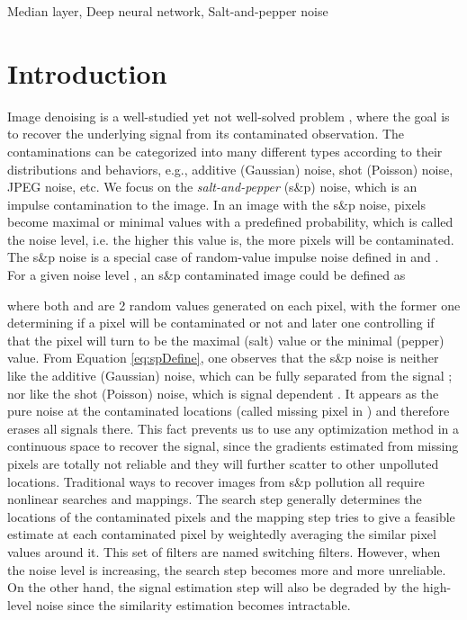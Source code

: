 \documentclass[journal]{IEEEtran}
\begin{document}
\begin{IEEEkeywords}
Median layer, Deep neural network, Salt-and-pepper noise
\end{IEEEkeywords}






\IEEEpeerreviewmaketitle



\section{Introduction}

Image denoising is a well-studied yet not well-solved problem \cite{zhang2017beyond,zhang2018ffdnet,Liu2018,Fu2018Multimedia,Lehtinen2018,aaai_furuta_2019,chen2018DeepBoosting}, where the goal is to recover the underlying signal from its contaminated observation. The contaminations can be categorized into many different types according to their distributions and behaviors, e.g., additive (Gaussian) noise, shot (Poisson) noise, JPEG noise, etc. We focus on the \emph{salt-and-pepper} (s\&p) noise, which is an impulse contamination to the image. In an image with the s\&p noise, pixels become maximal or minimal values with a predefined probability, which is called the noise level, i.e. the higher this value is, the more pixels will be contaminated. The s\&p noise is a special case of random-value impulse noise defined in \cite{Fu2018Multimedia} and \cite{Lehtinen2018}. For a given noise level , an s\&p contaminated image could be defined as

where both  and  are 2 random values generated on each pixel, with the former one determining if a pixel will be contaminated or not and later one controlling if that the pixel will turn to be the maximal (salt) value or the minimal (pepper) value.
From Equation \ref{eq:spDefine}, one observes that the s\&p noise is neither like the additive (Gaussian) noise, which can be fully separated from the signal \cite{zhang2017beyond}; nor like the shot (Poisson) noise, which is signal dependent \cite{Lehtinen2018}. It appears as the pure noise at the contaminated locations (called missing pixel in \cite{Lehtinen2018}) and therefore erases all signals there. This fact prevents us to use any optimization method in a continuous space to recover the signal, since the gradients estimated from missing pixels are totally not reliable and they will further scatter to other unpolluted locations. Traditional ways to recover images from s\&p pollution all require nonlinear searches and mappings. The search step \cite{Wang2011,Varghese2015,Julie2016} generally determines the locations of the contaminated pixels and the mapping step tries to give a feasible estimate at each contaminated pixel by weightedly averaging the similar pixel values around it. This set of filters are named switching filters. However, when the noise level is increasing, the search step becomes more and more unreliable. On the other hand, the signal estimation step will also be degraded by the high-level noise since the similarity estimation becomes intractable.
\end{document}
